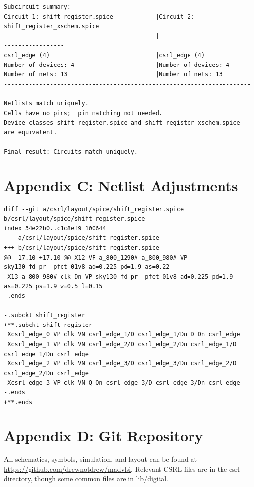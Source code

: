 \documentclass[11pt]{article}
\begin{document}
\begin{lstlisting}
Subcircuit summary:
Circuit 1: shift_register.spice            |Circuit 2: shift_register_xschem.spice     
-------------------------------------------|-------------------------------------------
csrl_edge (4)                              |csrl_edge (4)                              
Number of devices: 4                       |Number of devices: 4                       
Number of nets: 13                         |Number of nets: 13                         
---------------------------------------------------------------------------------------
Netlists match uniquely.
Cells have no pins;  pin matching not needed.
Device classes shift_register.spice and shift_register_xschem.spice are equivalent.

Final result: Circuits match uniquely.
\end{lstlisting}

\newpage

\section*{Appendix C: Netlist Adjustments}
\begin{lstlisting}
diff --git a/csrl/layout/spice/shift_register.spice b/csrl/layout/spice/shift_register.spice
index 34e22b0..c1c8ef9 100644
--- a/csrl/layout/spice/shift_register.spice
+++ b/csrl/layout/spice/shift_register.spice
@@ -17,10 +17,10 @@ X12 VP a_800_1290# a_800_980# VP sky130_fd_pr__pfet_01v8 ad=0.225 pd=1.9 as=0.22
 X13 a_800_980# clk Dn VP sky130_fd_pr__pfet_01v8 ad=0.225 pd=1.9 as=0.225 ps=1.9 w=0.5 l=0.15
 .ends
 
-.subckt shift_register
+**.subckt shift_register
 Xcsrl_edge_0 VP clk VN csrl_edge_1/D csrl_edge_1/Dn D Dn csrl_edge
 Xcsrl_edge_1 VP clk VN csrl_edge_2/D csrl_edge_2/Dn csrl_edge_1/D csrl_edge_1/Dn csrl_edge
 Xcsrl_edge_2 VP clk VN csrl_edge_3/D csrl_edge_3/Dn csrl_edge_2/D csrl_edge_2/Dn csrl_edge
 Xcsrl_edge_3 VP clk VN Q Qn csrl_edge_3/D csrl_edge_3/Dn csrl_edge
-.ends
+**.ends
\end{lstlisting}

\newpage

\section*{Appendix D: Git Repository}

All schematics, symbols, simulation, and layout can be found at \href{https://github.com/drewnotdrew/madvlsi}{https://github.com/drewnotdrew/madvlsi}. Relevant CSRL files are in the csrl directory, though some common files are in lib/digital.
\end{document}
